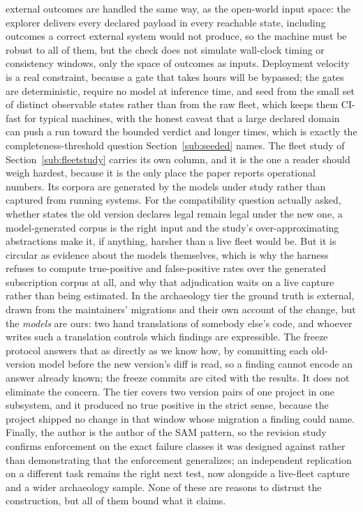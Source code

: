 \documentclass[11pt]{article}
\begin{document}
external outcomes are handled the same way, as the open-world input space: the
explorer delivers every declared payload in every reachable state, including
outcomes a correct external system would not produce, so the machine must be
robust to all of them, but the check does not simulate wall-clock timing or
consistency windows, only the space of outcomes as inputs. Deployment velocity is
a real constraint, because a gate that takes hours will be bypassed; the gates
are deterministic, require no model at inference time, and seed from the small set
of distinct observable states rather than from the raw fleet, which keeps them
CI-fast for typical machines, with the honest caveat that a large declared domain
can push a run toward the bounded verdict and longer times, which is exactly the
completeness-threshold question Section~\ref{sub:seeded} names. The fleet study of Section~\ref{sub:fleetstudy} carries its own
column, and it is the one a reader should weigh hardest, because it is the only
place the paper reports operational numbers. Its corpora are generated by the
models under study rather than captured from running systems. For the
compatibility question actually asked, whether states the old version declares
legal remain legal under the new one, a model-generated corpus is the right
input and the study's over-approximating abstractions make it, if anything,
harsher than a live fleet would be. But it is circular as evidence about the
models themselves, which is why the harness refuses to compute true-positive and
false-positive rates over the generated subscription corpus at all, and why that
adjudication waits on a live capture rather than being estimated. In the
archaeology tier the ground truth is external, drawn from the maintainers'
migrations and their own account of the change, but the \emph{models} are ours:
two hand translations of somebody else's code, and whoever writes such a
translation controls which findings are expressible. The freeze protocol answers
that as directly as we know how, by committing each old-version model before the
new version's diff is read, so a finding cannot encode an answer already known;
the freeze commits are cited with the results. It does not eliminate the
concern. The tier covers two version pairs of one project in one subsystem, and
it produced no true positive in the strict sense, because the project shipped no
change in that window whose migration a finding could name. Finally, the author
is the author of the SAM pattern, so the revision study confirms enforcement on
the exact failure classes it was designed against rather than demonstrating that
the enforcement generalizes; an independent replication on a different task
remains the right next test, now alongside a live-fleet capture and a wider
archaeology sample. None of these are reasons to distrust the construction, but
all of them bound what it claims.
\end{document}

